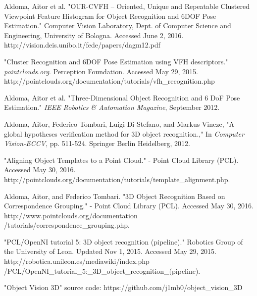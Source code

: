 \documentclass[journal]{IEEEtran}
\begin{document}
\begin{thebibliography}{1}

Aldoma, Aitor et al. "OUR-CVFH – Oriented, Unique and Repeatable Clustered Viewpoint Feature Histogram for Object Recognition and 6DOF Pose Estimation."  Computer Vision Laboratory, Dept. of Computer Science and Engineering, University of Bologna.  Accessed June 2, 2016.  http://vision.deis.unibo.it/fede/papers/dagm12.pdf

"Cluster Recognition and 6DOF Pose Estimation using VFH descriptors." \emph{pointclouds.org}.  Perception Foundation.
Accessed May 29, 2015. http://pointclouds.org/documentation/tutorials/vfh\_recognition.php



Aldoma, Aitor et al.  "Three-Dimensional Object Recognition and 6 DoF Pose Estimation." \emph{IEEE Robotics \& Automation Magazine}, September 2012.


Aldoma, Aitor, Federico Tombari, Luigi Di Stefano, and Markus Vincze, "A global hypotheses verification method for 3D object recognition.," In \emph{Computer Vision-ECCV}, pp. 511-524. Springer Berlin Heidelberg, 2012.

"Aligning Object Templates to a Point Cloud." - Point Cloud Library (PCL).  Accessed May 30, 2016.  http://pointclouds.org/documentation/tutorials/template\_alignment.php.


Aldoma, Aitor, and Federico Tombari. "3D Object Recognition Based on Correspondence Grouping." - Point Cloud Library (PCL). Accessed May 30, 2016. http://www.pointclouds.org/documentation \\ /tutorials/correspondence\_grouping.php. 


"PCL/OpenNI tutorial 5: 3D object recognition (pipeline)." Robotics Group of the University of Leon.  Updated Nov 1, 2015.  Accessed May 29, 2015.  http://robotica.unileon.es/mediawiki/index.php \\ /PCL/OpenNI\_tutorial\_5:\_3D\_object\_recognition\_(pipeline).


"Object Vision 3D" source code: https://github.com/j1mb0/object\_vision\_3D
\end{thebibliography}






\end{document}
